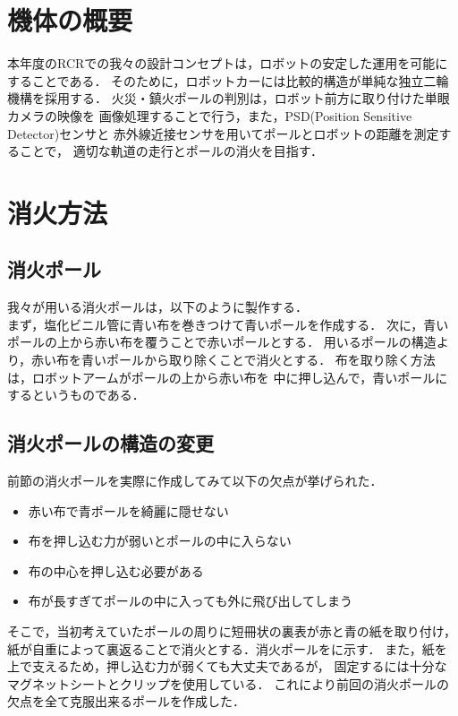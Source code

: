 \documentclass[11pt,a4]{jsarticle}
\begin{document}

\section{機体の概要}  %

  本年度のRCRでの我々の設計コンセプトは，ロボットの安定した運用を可能にすることである．
  そのために，ロボットカーには比較的構造が単純な独立二輪機構を採用する．
  火災・鎮火ポールの判別は，ロボット前方に取り付けた単眼カメラの映像を
  画像処理することで行う，また，PSD(Position Sensitive Detector)センサと
  赤外線近接センサを用いてポールとロボットの距離を測定することで，
  適切な軌道の走行とポールの消火を目指す．


\section{消火方法}  %

  \subsection{消火ポール}
    我々が用いる消火ポールは，以下のように製作する．\\
    まず，塩化ビニル管に青い布を巻きつけて青いポールを作成する．
    次に，青いポールの上から赤い布を覆うことで赤いポールとする．
    用いるポールの構造より，赤い布を青いポールから取り除くことで消火とする．
    布を取り除く方法は，ロボットアームがポールの上から赤い布を
    中に押し込んで，青いポールにするというものである．

  \subsection{消火ポールの構造の変更}
    前節の消火ポールを実際に作成してみて以下の欠点が挙げられた．
    \begin{itemize}
      \item 赤い布で青ポールを綺麗に隠せない
      \item 布を押し込む力が弱いとポールの中に入らない
      \item 布の中心を押し込む必要がある
      \item 布が長すぎてポールの中に入っても外に飛び出してしまう
    \end{itemize}
    そこで，当初考えていたポールの周りに短冊状の裏表が赤と青の紙を取り付け，
    紙が自重によって裏返ることで消火とする．消火ポールをに示す．
    また，紙を上で支えるため，押し込む力が弱くても大丈夫であるが，
    固定するには十分なマグネットシートとクリップを使用している．
    これにより前回の消火ポールの欠点を全て克服出来るポールを作成した．
\end{document}

